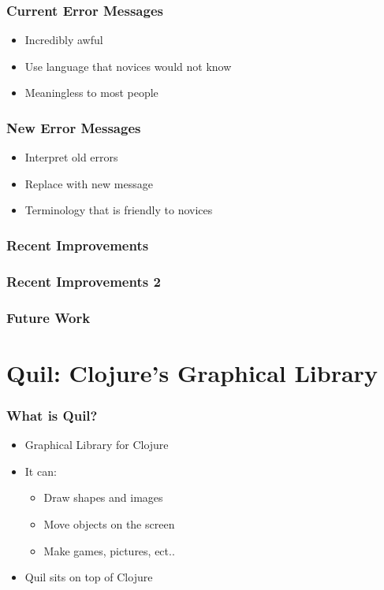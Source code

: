 \documentclass{beamer}
\begin{document}
\begin{frame}
	\frametitle{Current Error Messages}
	\begin{itemize}
		\item Incredibly awful
		\item Use language that novices would not know
		\item Meaningless to most people
	\end{itemize}
\end{frame}

\begin{frame}
	\frametitle{New Error Messages}
	\begin{itemize}
		\item Interpret old errors
		\item Replace with new message
		\item Terminology that is friendly to novices
	\end{itemize}
\end{frame}

\begin{frame}
	\frametitle{Recent Improvements}
\end{frame}

\begin{frame}
	\frametitle{Recent Improvements 2}
\end{frame}

\begin{frame}
	\frametitle{Future Work}
\end{frame}




\section{Quil: Clojure's Graphical Library}

\begin{frame}
	\frametitle{What is Quil?}
	\begin{itemize}
  		\item Graphical Library for Clojure
  		\item It can:
  		\begin{itemize}
  	 		\item Draw shapes and images
  	 		\item Move objects on the screen
  	 		\item Make games, pictures, ect..
  		\end{itemize}
  		\item Quil sits on top of Clojure
	 \end{itemize}
\end{frame}
\end{document}
